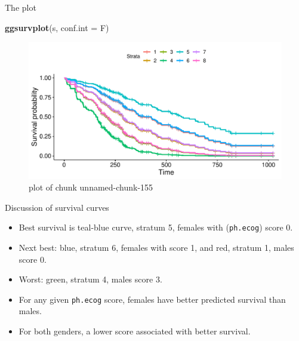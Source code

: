 \documentclass[ignorenonframetext,]{beamer}
\newenvironment{Shaded}{\begin{snugshade}}{\end{snugshade}}
\newcommand{\DataTypeTok}[1]{\textcolor[rgb]{0.13,0.29,0.53}{#1}}
\newcommand{\KeywordTok}[1]{\textcolor[rgb]{0.13,0.29,0.53}{\textbf{#1}}}
\newcommand{\NormalTok}[1]{#1}
\begin{document}
\begin{frame}[fragile]{The plot}
\protect\hypertarget{the-plot-4}{}

\begin{Shaded}
\begin{Highlighting}[]
\KeywordTok{ggsurvplot}\NormalTok{(s, }\DataTypeTok{conf.int =}\NormalTok{ F)}
\end{Highlighting}
\end{Shaded}

\begin{figure}
\centering
\includegraphics{figure/unnamed-chunk-155-1.pdf}
\caption{plot of chunk unnamed-chunk-155}
\end{figure}

\end{frame}

\begin{frame}[fragile]{Discussion of survival curves}
\protect\hypertarget{discussion-of-survival-curves}{}

\begin{itemize}
\item
  Best survival is teal-blue curve, stratum 5, females with
  (\texttt{ph.ecog}) score 0.
\item
  Next best: blue, stratum 6, females with score 1, and red, stratum 1,
  males score 0.
\item
  Worst: green, stratum 4, males score 3.
\item
  For any given \texttt{ph.ecog} score, females have better predicted
  survival than males.
\item
  For both genders, a lower score associated with better survival.
\end{itemize}

\end{frame}
\end{document}
